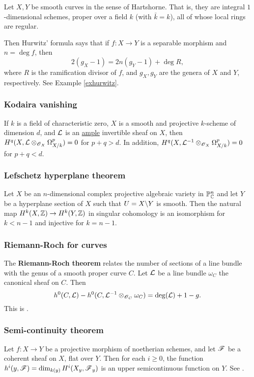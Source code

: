 \documentclass[11pt, english]{article}
\begin{document}
Let $X,Y$ be smooth curves in the sense of Hartshorne. That is, they are integral $1$-dimensional schemes, proper over a field $k$ (with $\bar k = k$), all of whose local rings are regular.

Then Hurwitz' formula says that if $f:X \to Y$ is a separable morphism and $n= \deg f$, then
\[
2(g_X-1) = 2n(g_Y-1) + \deg R,
\]
where $R$ is the ramification divisor of $f$, and $g_X,g_Y$ are the genera of $X$ and $Y$, respectively. See Example \ref{exhurwitz}. 

\subsubsection{Kodaira vanishing}
\label{kodairavanishing}
If $k$ is a field of characteristic zero, $X$ is a smooth and projective $k$-scheme of dimension $d$, and $\mathcal{L}$ is an \hyperref[amplelinebundle]{ample} invertible sheaf on $X$, then ${H^q(X,{\mathcal{L} \otimes_{\operatorname{\mathscr{O}}_X} \Omega^p_{X/k}})=0}$ for $p+q > d$. In addition, $H^q(X,\mathcal{L}^{-1} \otimes_{\operatorname{\mathscr{O}}_X} \Omega_{X/k}^p)=0$ for $p+q < d$. 

\subsubsection{Lefschetz hyperplane theorem}
\label{lefschetz} 
Let $X$ be an $n$-dimensional complex projective algebraic variety in $\mathbb{P}_{\mathbb{C}}^n$ and let $Y$ be a hyperplane section of $X$ such that $U=X \backslash Y$ is smooth. Then the natural map $H^k(X,\mathbb{Z}) \to H^k(Y,\mathbb{Z})$ in singular cohomology is an isomorphism for $k<n-1$ and injective for $k=n-1$.

\subsubsection{Riemann-Roch for curves}
\label{riemannroch}

The \textbf{Riemann-Roch theorem} relates the number of sections of a line bundle with the genus of a smooth proper curve $C$. Let $\mathcal{L}$ be a line bundle $\omega_C$ the canonical sheaf on $C$. Then
\[
h^0(C,\mathcal{L}) - h^0(C, \mathcal{L}^{-1} \otimes_{\operatorname{\mathscr{O}}_{C}} \omega_C) = \deg(\mathcal{L}) +1 -g.
\]
This is \cite[Theorem IV.1.3]{hartshorne}.

\subsubsection{Semi-continuity theorem}
\label{semicontinuity}

Let $f:X \to Y$ be a projective morphism of noetherian schemes, and let $\operatorname{\mathscr{F}}$ be a coherent sheaf on $X$, flat over $Y$. Then for each $i \geq 0$, the function $h^i(y,\operatorname{\mathscr{F}})=\dim_{k(y)} H^i(X_y,\operatorname{\mathscr{F}}_y)$ is an upper semicontinuous function on $Y$. See \cite[Chapter III, Theorem 12.8]{hartshorne}.
\end{document}
